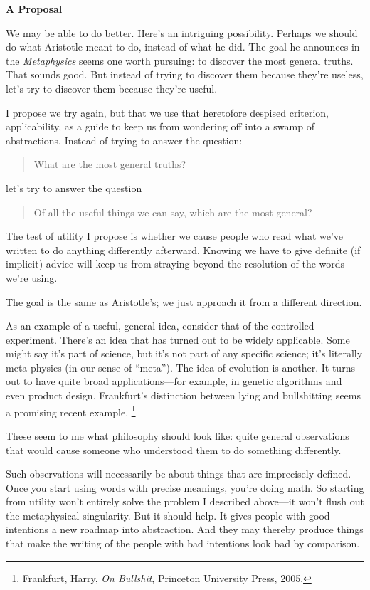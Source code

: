 \documentclass[12pt]{book}
\begin{document}
\textbf{A Proposal}

We may be able to do better. Here's an intriguing possibility. Perhaps
we should do what Aristotle meant to do, instead of what he did. The
goal he announces in the \emph{Metaphysics} seems one worth pursuing: to
discover the most general truths. That sounds good. But instead of
trying to discover them because they're useless, let's try to discover
them because they're useful.

I propose we try again, but that we use that heretofore despised
criterion, applicability, as a guide to keep us from wondering off into
a swamp of abstractions. Instead of trying to answer the question:

\begin{quote}
What are the most general truths?
\end{quote}

let's try to answer the question

\begin{quote}
Of all the useful things we can say, which are the most general?
\end{quote}

The test of utility I propose is whether we cause people who read what
we've written to do anything differently afterward. Knowing we have to
give definite (if implicit) advice will keep us from straying beyond the
resolution of the words we're using.

The goal is the same as Aristotle's; we just approach it from a
different direction.

As an example of a useful, general idea, consider that of the controlled
experiment. There's an idea that has turned out to be widely applicable.
Some might say it's part of science, but it's not part of any specific
science; it's literally meta-physics (in our sense of ``meta''). The
idea of evolution is another. It turns out to have quite broad
applications---for example, in genetic algorithms and even product
design. Frankfurt's distinction between lying and bullshitting seems a
promising recent example. \footnote{Frankfurt, Harry, \emph{On Bullshit}, Princeton University
Press, 2005.}

These seem to me what philosophy should look like: quite general
observations that would cause someone who understood them to do
something differently.

Such observations will necessarily be about things that are imprecisely
defined. Once you start using words with precise meanings, you're doing
math. So starting from utility won't entirely solve the problem I
described above---it won't flush out the metaphysical singularity. But
it should help. It gives people with good intentions a new roadmap into
abstraction. And they may thereby produce things that make the writing
of the people with bad intentions look bad by comparison.
\end{document}
